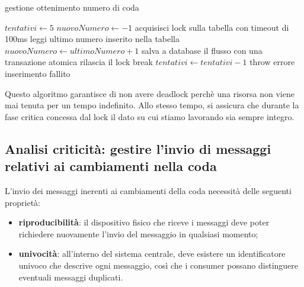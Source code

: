 \documentclass[a4paper, titlepage, 12pt, openright, oneside]{book}
\begin{document}
\begin{algorithm}
\caption{gestione ottenimento numero di coda}
\begin{algorithmic}[1]
\State $tentativi \gets 5$
\State $nuovoNumero \gets -1$
\State acquisisci lock sulla tabella con timeout di 100ms
\State leggi ultimo numero inserito nella tabella
\State $nuovoNumero \gets ultimoNumero + 1$
\State salva a database il flusso con una transazione atomica
\State rilascia il lock
\State break
\Else
\State $tentativi \gets tentativi - 1$
\EndIf
\EndWhile
{}
\State throw errore inserimento fallito
\EndIf
\end{algorithmic}
\end{algorithm}

Questo algoritmo garantisce di non avere deadlock perchè una risorsa non viene mai tenuta per un tempo indefinito. Allo stesso tempo, si assicura che durante la fase critica concessa dal lock il dato su cui stiamo lavorando sia sempre integro.

\subsection{Analisi criticità: gestire l'invio di messaggi relativi ai cambiamenti nella coda}

L'invio dei messaggi inerenti ai cambiamenti della coda necessità delle seguenti proprietà:

\begin{itemize}
	\item \textbf{riproducibilità}: il dispositivo fisico che riceve i messaggi deve poter richiedere nuovamente l'invio del messaggio in qualsiasi momento;
	\item \textbf{univocità}: all'interno del sistema centrale, deve esistere un identificatore univoco che descrive ogni messaggio, così che i consumer possano distinguere eventuali messaggi duplicati.
\end{itemize}
\end{document}

